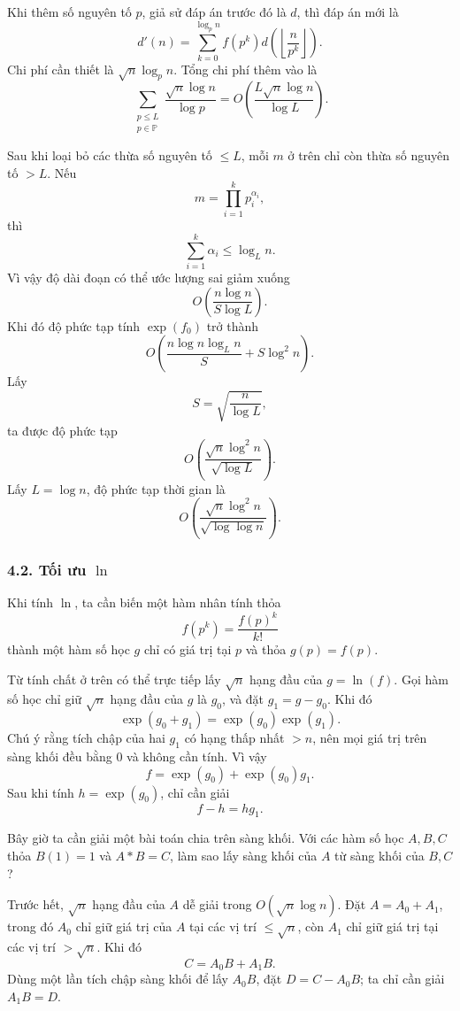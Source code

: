 \documentclass[11pt]{article}
\begin{document}
Khi thêm số nguyên tố \(p\), giả sử đáp án trước đó là \(d\), thì đáp án mới
là
\[
  d'(n)=\sum_{k=0}^{\log_p n}
  f(p^k)d\left(\left\lfloor\frac{n}{p^k}\right\rfloor\right).
\]
Chi phí cần thiết là \(\sqrt n\log_p n\). Tổng chi phí thêm vào là
\[
  \sum_{\substack{p\le L\\p\in\mathbb P}}
  \frac{\sqrt n\log n}{\log p}
  =
  O\left(\frac{L\sqrt n\log n}{\log L}\right).
\]

Sau khi loại bỏ các thừa số nguyên tố \(\le L\), mỗi \(m\) ở trên chỉ còn thừa
số nguyên tố \(>L\). Nếu
\[
  m=\prod_{i=1}^{k}p_i^{\alpha_i},
\]
thì
\[
  \sum_{i=1}^{k}\alpha_i\le\log_L n.
\]
Vì vậy độ dài đoạn có thể ước lượng sai giảm xuống
\[
  O\left(\frac{n\log n}{S\log L}\right).
\]
Khi đó độ phức tạp tính \(\exp(f_0)\) trở thành
\[
  O\left(\frac{n\log n\log_L n}{S}+S\log^2 n\right).
\]
Lấy
\[
  S=\sqrt{\frac{n}{\log L}},
\]
ta được độ phức tạp
\[
  O\left(\frac{\sqrt n\log^2 n}{\sqrt{\log L}}\right).
\]
Lấy \(L=\log n\), độ phức tạp thời gian là
\[
  O\left(\frac{\sqrt n\log^2 n}{\sqrt{\log\log n}}\right).
\]

\subsubsection*{4.2. Tối ưu \(\ln\)}

Khi tính \(\ln\), ta cần biến một hàm nhân tính thỏa
\[
  f(p^k)=\frac{f(p)^k}{k!}
\]
thành một hàm số học \(g\) chỉ có giá trị tại \(p\) và thỏa \(g(p)=f(p)\).

Từ tính chất ở trên có thể trực tiếp lấy \(\sqrt n\) hạng đầu của
\(g=\ln(f)\). Gọi hàm số học chỉ giữ \(\sqrt n\) hạng đầu của \(g\) là \(g_0\),
và đặt \(g_1=g-g_0\). Khi đó
\[
  \exp(g_0+g_1)=\exp(g_0)\exp(g_1).
\]
Chú ý rằng tích chập của hai \(g_1\) có hạng thấp nhất \(>n\), nên mọi giá trị
trên sàng khối đều bằng \(0\) và không cần tính. Vì vậy
\[
  f=\exp(g_0)+\exp(g_0)g_1.
\]
Sau khi tính \(h=\exp(g_0)\), chỉ cần giải
\[
  f-h=hg_1.
\]

Bây giờ ta cần giải một bài toán chia trên sàng khối. Với các hàm số học
\(A,B,C\) thỏa \(B(1)=1\) và \(A*B=C\), làm sao lấy sàng khối của \(A\) từ
sàng khối của \(B,C\)?

Trước hết, \(\sqrt n\) hạng đầu của \(A\) dễ giải trong
\(O(\sqrt n\log n)\). Đặt \(A=A_0+A_1\), trong đó \(A_0\) chỉ giữ giá trị của
\(A\) tại các vị trí \(\le\sqrt n\), còn \(A_1\) chỉ giữ giá trị tại các vị trí
\(>\sqrt n\). Khi đó
\[
  C=A_0B+A_1B.
\]
Dùng một lần tích chập sàng khối để lấy \(A_0B\), đặt \(D=C-A_0B\); ta chỉ cần
giải \(A_1B=D\).
\end{document}
